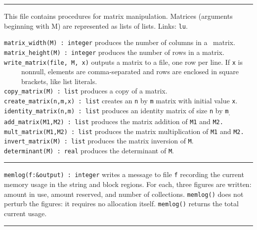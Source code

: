 \vspace{0.25cm}\hrule{}

This file contains procedures for matrix
manipulation. Matrices (arguments beginning with M) are represented as
lists of lists. Links: \texttt{lu}.

\texttt{matrix\_width(M) : integer} produces the number of columns in a
\ matrix.\\
\texttt{matrix\_height(M) : integer} produces the number of rows in a
matrix.\\
\texttt{write\_matrix(file, M, x)} outputs a matrix to a file, one row
per line. If \texttt{x} is\\
 \ \ \ \ \ nonnull, elements are comma-separated and rows are enclosed
in square\\
 \ \ \ \ \ brackets, like list literals.\\
\texttt{copy\_matrix(M) : list} produces a copy of a matrix.\\
\texttt{create\_matrix(n,m,x) : list} creates an \texttt{n} by
\texttt{m} matrix with initial value \texttt{x}.\\
\texttt{identity\_matrix(n,m) : list} produces an identity matrix of
size \texttt{n} by \texttt{m}\textsubscript{.}\\
\texttt{add\_matrix(M1,M2) : list} produces the matrix addition of
\texttt{M1} and \texttt{M2.}\\
\texttt{mult\_matrix(M1,M2) : list} produces the matrix multiplication
of \texttt{M1} and \texttt{M2.}\\
\texttt{invert\_matrix(M) : list} produces the matrix inversion of
\texttt{M}.\\
\texttt{determinant(M) : real} produces the determinant of \texttt{M}.


\vspace{0.25cm}\hrule{}

\texttt{memlog(f:\&output) : integer} writes a message to file
\texttt{f} recording the current memory usage in the string and block
regions. For each, three figures are written: amount in use, amount
reserved, and number of collections. \texttt{memlog()} does not perturb
the figures: it requires no allocation itself. \texttt{memlog()}
returns the total current usage.

\vspace{0.25cm}\hrule{}

